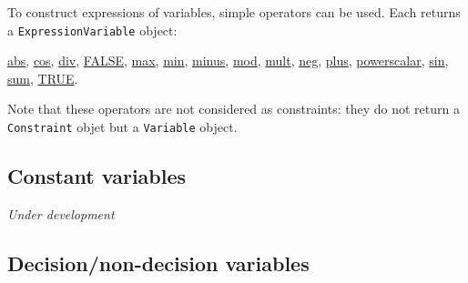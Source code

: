 To construct expressions of variables, simple operators can be used. Each returns a \texttt{ExpressionVariable} object:
\begin{notedef}
\hyperlink{abs:absoperator}{abs}, \hyperlink{cos:cosoperator}{cos}, \hyperlink{div:divoperator}{div}, \hyperlink{false:falseoperator}{FALSE}, \hyperlink{max:maxoperator}{max}, \hyperlink{min:minoperator}{min}, \hyperlink{minus:minusoperator}{minus}, \hyperlink{mod:modoperator}{mod}, \hyperlink{mult:multoperator}{mult}, \hyperlink{neg:negoperator}{neg}, \hyperlink{plus:plusoperator}{plus}, \hyperlink{power:poweroperator}{power}\hyperlink{scalar:scalaroperator}{scalar}, \hyperlink{sin:sinoperator}{sin}, \hyperlink{sum:sumoperator}{sum}, \hyperlink{true:trueoperator}{TRUE}.
\end{notedef}
Note that these operators are not considered as constraints: they do not return a \texttt{Constraint} objet but a \texttt{Variable} object.

\subsection{Constant variables}\label{model:constantvariables}\hypertarget{model:constantvariables}{}
\emph{Under development}

\subsection{Decision/non-decision variables}\label{model:decisionvariables}\hypertarget{model:decisionvariables}{}


